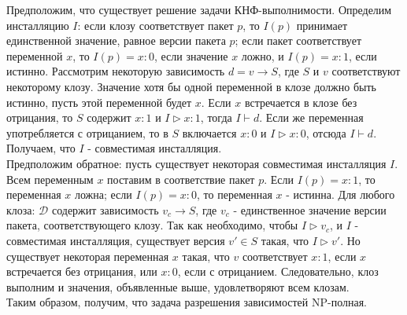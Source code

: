 Предположим, что существует решение задачи КНФ-выполнимости. Определим инсталляцию 
$I$: если клозу соответствует пакет $p$, то $I(p)$ принимает единственной значение, 
равное версии пакета $p$; если пакет соответствует переменной $x$, то $I(p) = x:0$,
если значение $x$ ложно, и $I(p) = x:1$, если истинно. Рассмотрим некоторую зависимость
$d = v \to S$, где $S$ и $v$ соответствуют некоторому клозу. Значение хотя бы одной
переменной в клозе должно быть истинно, пусть этой переменной будет $x$. Если $x$ 
встречается в клозе без отрицания, то $S$ содержит $x:1$ и $I \rhd x:1$, тогда $I \vdash d$.
Если же переменная употребляется с отрицанием, то в $S$ включается $x:0$ и $I \rhd x:0$, отсюда 
$I \vdash d$. Получаем, что  $I$ - совместимая инсталляция.\\

Предположим обратное: пусть существует некоторая совместимая инсталляция $I$. Всем переменным 
$x$ поставим в соответствие пакет $p$. Если $I(p) = x:1$, то переменная $x$ ложна; если 
$I(p) = x:0$, то переменная $x$ - истинна. Для любого клоза: $\mathcal{D}$ содержит зависимость
$v_c \to S$, где $v_c$ - единственное значение версии пакета, соответствующего клозу. Так как 
необходимо, чтобы $I \rhd v_c$, и $I$ - совместимая инсталляция, существует версия $v' \in S$
такая, что $I \rhd v'$. Но существует  некоторая переменная $x$ такая, что $v$ соответствует 
$x:1$, если $x$ встречается без отрицания, или $x:0$, если с отрицанием. Следовательно, клоз 
выполним и значения, объявленные выше, удовлетворяют всем клозам.\\

Таким образом, получим, что задача разрешения зависимостей  NP-полная.\\
